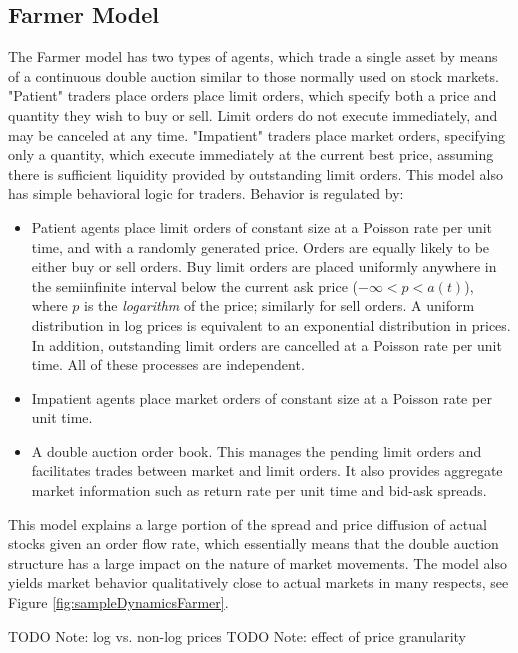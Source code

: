 \documentclass[runningheads]{llncs}
\begin{document}
\subsection{Farmer Model}
The Farmer model \cite{farmer2003} has two types of agents, which trade a single asset by means of a continuous double auction similar to those normally used on stock markets. "Patient" traders place orders place limit orders, which specify both a price and quantity they wish to buy or sell. Limit orders do not execute immediately, and may be canceled at any time. "Impatient" traders place market orders, specifying only a quantity, which execute immediately at the current best price, assuming there is sufficient liquidity provided by outstanding limit orders. This model also has simple behavioral logic for traders. Behavior is regulated by:
\begin{itemize}
\item Patient agents place limit orders of constant size at a Poisson rate per unit time, and with a randomly generated price. Orders are equally likely to be either buy or sell orders. Buy limit orders are placed uniformly anywhere in the semiinfinite interval below the current ask price ($-\infty < p < a(t)$), where $p$ is the \emph{logarithm} of the price; similarly for sell orders. A uniform distribution in log prices is equivalent to an exponential distribution in prices. In addition, outstanding limit orders are cancelled at a Poisson rate per unit time. All of these processes are independent.
\item Impatient agents place market orders of constant size at a Poisson rate per unit time.
\item A double auction order book. This manages the pending limit orders and facilitates trades between market and limit orders. It also provides aggregate market information such as return rate per unit time and bid-ask spreads.
\end{itemize}
This model explains a large portion of the spread and price diffusion of actual stocks given an order flow rate, which essentially means that the double auction structure has a large impact on the nature of market movements. The model also yields market behavior qualitatively close to actual markets in many respects, see Figure \ref{fig:sampleDynamicsFarmer}.

TODO Note: log vs. non-log prices
TODO Note: effect of price granularity
\end{document}
